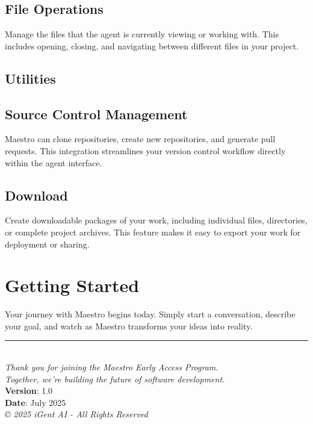 \documentclass[11pt,letterpaper]{article}
\begin{document}
\subsection*{File Operations}

Manage the files that the agent is currently viewing or working with. This includes opening, closing, and navigating between different files in your project.

\subsection*{Utilities}

\subsection*{Source Control Management}

Maestro can clone repositories, create new repositories, and generate pull requests. This integration streamlines your version control workflow directly within the agent interface.

\subsection*{Download}

Create downloadable packages of your work, including individual files, directories, or complete project archives. This feature makes it easy to export your work for deployment or sharing.

\section*{\color{maestroBlue}Getting Started}

Your journey with Maestro begins today. Simply start a conversation, describe your goal, and watch as Maestro transforms your ideas into reality.

\vfill

\begin{center}
    \rule{0.5\textwidth}{0.4pt}\\[0.4cm]
    \textit{Thank you for joining the Maestro Early Access Program.\\
    Together, we're building the future of software development.}\\[0.5cm]
    \textbf{Version}: 1.0\\
    \textbf{Date}: July 2025\\[0.2cm]
    \footnotesize\color{darkGray}\textit{© 2025 iGent AI - All Rights Reserved}
\end{center}
\end{document}
